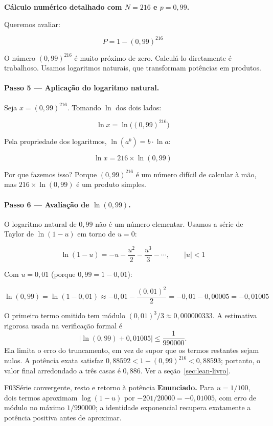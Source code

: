 \begin{resultado}
\textbf{Cálculo numérico detalhado com $N = 216$ e $p = 0{,}99$.}

Queremos avaliar:

\[
P = 1 - (0{,}99)^{216}
\]

O número $(0{,}99)^{216}$ é muito próximo de zero. Calculá-lo diretamente é trabalhoso. Usamos logaritmos naturais, que transformam potências em produtos.

\paragraph{Passo 5 — Aplicação do logaritmo natural.}
Seja $x = (0{,}99)^{216}$. Tomando $\ln$ dos dois lados:

\[
\ln x = \ln\bigl((0{,}99)^{216}\bigr)
\]

Pela propriedade dos logaritmos, $\ln(a^b) = b \cdot \ln a$:

\[
\ln x = 216 \times \ln(0{,}99)
\]

Por que fazemos isso? Porque $(0{,}99)^{216}$ é um número difícil de calcular à mão, mas $216 \times \ln(0{,}99)$ é um produto simples.

\paragraph{Passo 6 — Avaliação de $\ln(0{,}99)$.}
O logaritmo natural de $0{,}99$ não é um número elementar. Usamos a série de Taylor de $\ln(1-u)$ em torno de $u = 0$:

\[
\ln(1-u) = -u - \frac{u^2}{2} - \frac{u^3}{3} - \cdots, \qquad |u| < 1
\]

Com $u = 0{,}01$ (porque $0{,}99 = 1 - 0{,}01$):

\[
\ln(0{,}99) = \ln(1 - 0{,}01) \approx -0{,}01 - \frac{(0{,}01)^2}{2} = -0{,}01 - 0{,}00005 = -0{,}01005
\]

O primeiro termo omitido tem módulo $(0{,}01)^3/3 \approx 0{,}000000333$.
A estimativa rigorosa usada na verificação formal é
\[
\left|\ln(0{,}99)+0{,}01005\right|\leq\frac{1}{990000}.
\]
Ela limita o erro do truncamento, em vez de supor que os termos restantes
sejam nulos. A potência exata satisfaz
$0{,}88592<1-(0{,}99)^{216}<0{,}88593$; portanto, o valor final arredondado
a três casas é $0{,}886$. Ver a seção~\ref{sec:lean-livro}.

\begin{formalizacao}{F03}{Série convergente, resto e retorno à potência}
\textbf{Enunciado.} Para $u=1/100$, dois termos aproximam $\log(1-u)$ por $-201/20000=-0{,}01005$, com erro de módulo no máximo $1/990000$; a identidade exponencial recupera exatamente a potência positiva antes de aproximar.


\end{formalizacao}
\end{resultado}
